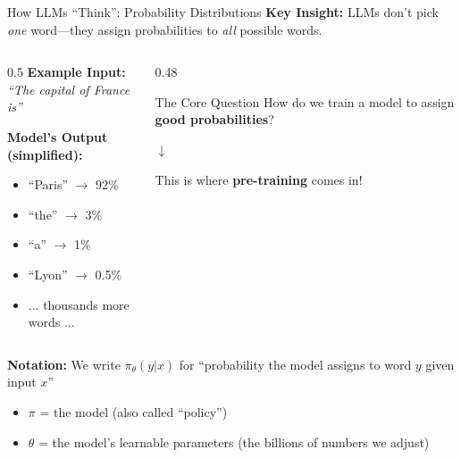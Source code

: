 \documentclass[aspectratio=169,11pt]{beamer}
\newcommand{\highlight}[1]{\textcolor{accentorange}{\textbf{#1}}}
\newcommand{\important}[1]{\textcolor{primaryblue}{\textbf{#1}}}
\begin{document}
\begin{frame}{How LLMs ``Think'': Probability Distributions}
\textbf{Key Insight:} LLMs don't pick \textit{one} word---they assign probabilities to \textit{all} possible words.

\vspace{0.3cm}
\begin{columns}[T]
\begin{column}{0.5\textwidth}
\textbf{Example Input:}\\
\textit{``The capital of France is''}

\vspace{0.3cm}
\textbf{Model's Output (simplified):}
\begin{itemize}
    \item ``Paris'' $\rightarrow$ 92\%
    \item ``the'' $\rightarrow$ 3\%
    \item ``a'' $\rightarrow$ 1\%
    \item ``Lyon'' $\rightarrow$ 0.5\%
    \item ... thousands more words ...
\end{itemize}
\end{column}
\begin{column}{0.48\textwidth}
\begin{block}{The Core Question}
How do we train a model to assign \highlight{good probabilities}?

\vspace{0.2cm}
\centering
$\downarrow$

\vspace{0.2cm}
This is where \important{pre-training} comes in!
\end{block}
\end{column}
\end{columns}

\vspace{0.3cm}
\textbf{Notation:} We write $\pi_\theta(y|x)$ for ``probability the model assigns to word $y$ given input $x$''
\begin{itemize}
    \item $\pi$ = the model (also called ``policy'')
    \item $\theta$ = the model's learnable parameters (the billions of numbers we adjust)
\end{itemize}
\end{frame}

\end{document}
